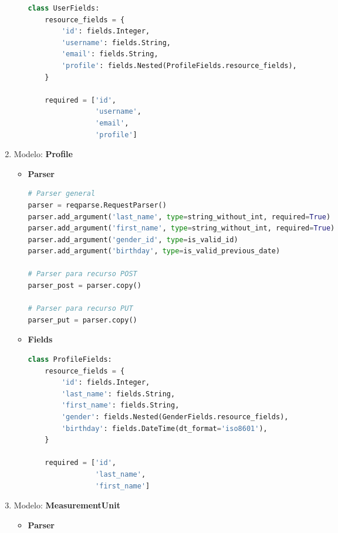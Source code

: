 \begin{enumerate}
\begin{itemize}
\begin{lstlisting}[language=Python]
class UserFields:
    resource_fields = {
        'id': fields.Integer,
        'username': fields.String,
        'email': fields.String,
        'profile': fields.Nested(ProfileFields.resource_fields),
    }

    required = ['id',
                'username',
                'email',
                'profile']
\end{lstlisting}
	
\end{itemize}

\item Modelo: \textbf{Profile}

\begin{itemize}
	\item \textbf{Parser}
	
\begin{lstlisting}[language=Python]
# Parser general
parser = reqparse.RequestParser()
parser.add_argument('last_name', type=string_without_int, required=True)
parser.add_argument('first_name', type=string_without_int, required=True)
parser.add_argument('gender_id', type=is_valid_id)
parser.add_argument('birthday', type=is_valid_previous_date)

# Parser para recurso POST
parser_post = parser.copy()

# Parser para recurso PUT
parser_put = parser.copy()
\end{lstlisting}

	\item \textbf{Fields}
	
\begin{lstlisting}[language=Python]
class ProfileFields:
    resource_fields = {
        'id': fields.Integer,
        'last_name': fields.String,
        'first_name': fields.String,
        'gender': fields.Nested(GenderFields.resource_fields),
        'birthday': fields.DateTime(dt_format='iso8601'),
    }

    required = ['id',
                'last_name',
                'first_name']
\end{lstlisting}

\end{itemize}

\item Modelo: \textbf{MeasurementUnit}

\begin{itemize}
	\item \textbf{Parser}
	

\end{itemize}
\end{enumerate}
